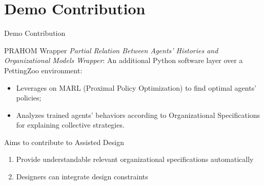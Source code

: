 \documentclass[9pt, aspectratio=169]{beamer}
\begin{document}







\section{Demo Contribution}
\begin{frame}{Demo Contribution}

    \begin{block}{PRAHOM Wrapper}
        \emph{Partial Relation Between Agents' Histories and Organizational Models Wrapper}: An additional Python software layer over a PettingZoo environment:
        \begin{itemize}
            \item Leverages on MARL (Proximal Policy Optimization) to find optimal agents' policies;
            \item Analyzes trained agents' behaviors according to Organizational Specifications for explaining collective strategies.
        \end{itemize}

    \end{block}

    \begin{block}{Aims to contribute to Assisted Design}
        
        \begin{enumerate}
            \item Provide understandable relevant organizational specifications automatically
            \item Designers can integrate design constraints
        \end{enumerate}

    \end{block}

\end{frame}
\end{document}
